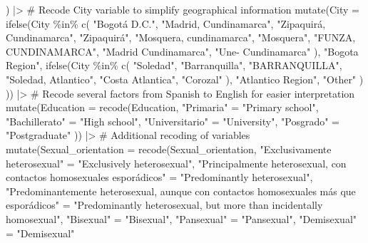 \documentclass[
  bookmarksnumbered]{article}
\newenvironment{Shaded}{\begin{snugshade}}{\end{snugshade}}
\newcommand{\AttributeTok}[1]{\textcolor[rgb]{0.80,0.80,0.80}{#1}}
\newcommand{\CommentTok}[1]{\textcolor[rgb]{0.50,0.62,0.50}{#1}}
\newcommand{\FunctionTok}[1]{\textcolor[rgb]{0.94,0.94,0.56}{#1}}
\newcommand{\NormalTok}[1]{\textcolor[rgb]{0.80,0.80,0.80}{#1}}
\newcommand{\OtherTok}[1]{\textcolor[rgb]{0.94,0.94,0.56}{#1}}
\newcommand{\SpecialCharTok}[1]{\textcolor[rgb]{0.86,0.64,0.64}{#1}}
\newcommand{\StringTok}[1]{\textcolor[rgb]{0.80,0.58,0.58}{#1}}
\begin{document}
\begin{Shaded}
\begin{Highlighting}[]
\NormalTok{  ) }\SpecialCharTok{|\textgreater{}}
  \CommentTok{\# Recode City variable to simplify geographical information}
  \FunctionTok{mutate}\NormalTok{(}\AttributeTok{City =} \FunctionTok{ifelse}\NormalTok{(City }\SpecialCharTok{\%in\%} \FunctionTok{c}\NormalTok{(}
    \StringTok{"Bogotá D.C."}\NormalTok{, }\StringTok{"Madrid, Cundinamarca"}\NormalTok{, }\StringTok{"Zipaquirá, Cundinamarca"}\NormalTok{,}
    \StringTok{"Zipaquirá"}\NormalTok{, }\StringTok{"Mosquera, cundinamarca"}\NormalTok{, }\StringTok{"Mosquera"}\NormalTok{,}
    \StringTok{"FUNZA, CUNDINAMARCA"}\NormalTok{, }\StringTok{"Madrid Cundinamarca"}\NormalTok{, }\StringTok{"Une{-} Cundinamarca"}
\NormalTok{  ),}
  \StringTok{"Bogota Region"}\NormalTok{,}
  \FunctionTok{ifelse}\NormalTok{(City }\SpecialCharTok{\%in\%} \FunctionTok{c}\NormalTok{(}
    \StringTok{"Soledad"}\NormalTok{, }\StringTok{"Barranquilla"}\NormalTok{, }\StringTok{"BARRANQUILLA"}\NormalTok{,}
    \StringTok{"Soledad, Atlantico"}\NormalTok{, }\StringTok{"Costa Atlantica"}\NormalTok{, }\StringTok{"Corozal"}
\NormalTok{  ),}
  \StringTok{"Atlantico Region"}\NormalTok{,}
  \StringTok{"Other"}
\NormalTok{  )}
\NormalTok{  )) }\SpecialCharTok{|\textgreater{}}
  \CommentTok{\# Recode several factors from Spanish to English for easier interpretation}
  \FunctionTok{mutate}\NormalTok{(}\AttributeTok{Education =} \FunctionTok{recode}\NormalTok{(Education,}
    \StringTok{"Primaria"} \OtherTok{=} \StringTok{"Primary school"}\NormalTok{,}
    \StringTok{"Bachillerato"} \OtherTok{=} \StringTok{"High school"}\NormalTok{,}
    \StringTok{"Universitario"} \OtherTok{=} \StringTok{"University"}\NormalTok{,}
    \StringTok{"Posgrado"} \OtherTok{=} \StringTok{"Postgraduate"}
\NormalTok{  )) }\SpecialCharTok{|\textgreater{}}
  \CommentTok{\# Additional recoding of variables}
  \FunctionTok{mutate}\NormalTok{(}\AttributeTok{Sexual\_orientation =} \FunctionTok{recode}\NormalTok{(Sexual\_orientation,}
    \StringTok{"Exclusivamente heterosexual"} \OtherTok{=}
      \StringTok{"Exclusively heterosexual"}\NormalTok{,}
    \StringTok{"Principalmente heterosexual, con contactos homosexuales esporádicos"} \OtherTok{=}
      \StringTok{"Predominantly heterosexual"}\NormalTok{,}
    \StringTok{"Predominantemente heterosexual, aunque con contactos homosexuales más que esporádicos"} \OtherTok{=}
      \StringTok{"Predominantly heterosexual, but more than incidentally homosexual"}\NormalTok{,}
    \StringTok{"Bisexual"} \OtherTok{=} \StringTok{"Bisexual"}\NormalTok{,}
    \StringTok{"Pansexual"} \OtherTok{=} \StringTok{"Pansexual"}\NormalTok{,}
    \StringTok{"Demisexual"} \OtherTok{=} \StringTok{"Demisexual"}

\end{Highlighting}
\end{Shaded}
\end{document}
